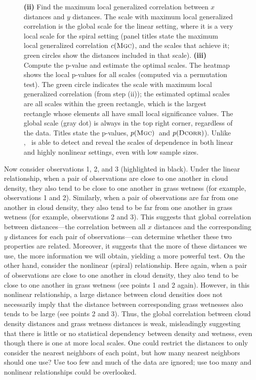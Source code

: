 \documentclass[11pt]{article}
\begin{document}
\begin{figure}
{%
\textbf{(ii)} Find the maximum local generalized correlation between $x$ distances and $y$ distances.  The scale with maximum local generalized correlation is the global scale for the linear setting, where it is a very local scale for the spiral setting (panel titles state the maximum local generalized correlation $c({\normalfont\textsc{Mgc}})$, and the scales that achieve it; green circles show the distances included in that scale).
\textbf{(iii)} Compute the p-value and estimate the optimal scales.
The heatmap shows the local p-values for all scales (computed via a permutation test). The green circle indicates the scale with maximum local generalized correlation (from step (ii));  the estimated optimal scales are all scales within the green rectangle, which is the largest rectangle whose elements all have small local significance values. The global scale (gray dot) is always in the top right corner, regardless of the data. 
Titles state the p-values,  $p({\normalfont\textsc{Mgc}})$~and $p({\normalfont\textsc{Dcorr}})$).
Unlike \Dcorr, \Mgc~is able to detect and reveal the scales of dependence in both linear and highly nonlinear settings, even with low sample sizes.}
\label{f:newschem}
\end{figure}



Now consider observations  1, 2, and 3 (highlighted in black).  Under the linear relationship, when a pair of observations are close to one another in cloud density, they  also tend to be close to one another in grass wetness (for example, observations 1 and 2).
Similarly, 
when a pair of observations are far from one another in cloud density, they also tend to be far from one another in grass wetness (for example, observations 2 and 3).  
This suggests that global correlation between distances---the correlation between all $x$ distances and the corresponding $y$ distances for each pair of observations---can determine whether these two properties are related.  Moreover, it suggests that the more of these distances we use, the more information we will obtain, yielding a more powerful test.
% 
On the other hand, consider the nonlinear (spiral) relationship.  Here again, when a pair of observations are close to one another in cloud density, they also tend to be close to one another in grass wetness (see points 1 and 2 again).  However, in this nonlinear relationship,  a large distance between cloud densities does not necessarily imply that the distance between corresponding grass wetnesses also tends to be large (see points 2 and 3).
Thus, the global correlation between cloud density distances and grass wetness distances is weak, misleadingly suggesting that there is little or no statistical dependency between density and wetness, even though there is one at more local scales.
One could restrict the distances to only consider  the nearest neighbors of each point, but how many nearest neighbors should one use?  Use too few and much of the data are ignored; use too many and nonlinear relationships could be overlooked. 
  
\end{document}
